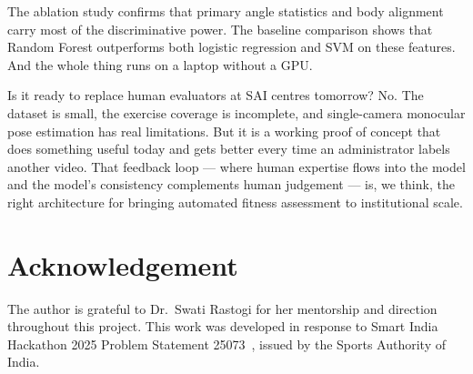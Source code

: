 \documentclass[conference]{IEEEtran}
\begin{document}
The ablation study confirms that primary angle statistics and body alignment carry most of the discriminative power. The baseline comparison shows that Random Forest outperforms both logistic regression and SVM on these features. And the whole thing runs on a laptop without a GPU.

Is it ready to replace human evaluators at SAI centres tomorrow? No. The dataset is small, the exercise coverage is incomplete, and single-camera monocular pose estimation has real limitations. But it is a working proof of concept that does something useful today and gets better every time an administrator labels another video. That feedback loop --- where human expertise flows into the model and the model's consistency complements human judgement --- is, we think, the right architecture for bringing automated fitness assessment to institutional scale.

\section*{Acknowledgement}
The author is grateful to Dr.~Swati Rastogi for her mentorship and direction throughout this project. This work was developed in response to Smart India Hackathon 2025 Problem Statement 25073~\cite{sih2025}, issued by the Sports Authority of India.
\end{document}
